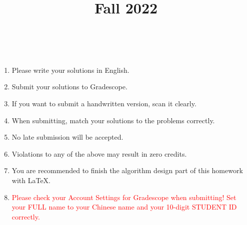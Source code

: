 \documentclass[11pt, addpoints, answers]{exam}
\title{
	\CourseName\\
	Fall 2022\\
	\HomeworkNO\\
}
\author{}
\date{\DueDate}
\begin{document}
\maketitle

\begin{enumerate}
	\item Please write your solutions in English.
	\item Submit your solutions to Gradescope.
	\item If you want to submit a handwritten version, scan it clearly.
	\item When submitting, match your solutions to the problems correctly.
	\item No late submission will be accepted.
	\item Violations to any of the above may result in zero credits.
	\item You are recommended to finish the algorithm design part of this homework with \LaTeX.
	\item \textcolor{red}{Please check your Account Settings for Gradescope when submitting! Set your FULL name to your Chinese name and your 10-digit STUDENT ID correctly.}
\end{enumerate}

\newpage

\begin{questions}

	\newpage

	

	\newpage

	

	\newpage

	

	\newpage

	

\end{questions}
\end{document}
